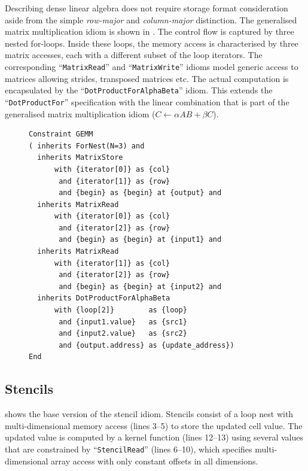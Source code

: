     Describing dense linear algebra does not require storage format
    consideration aside from the simple {\it row-major} and {\it column-major}
    distinction.
    The generalised matrix multiplication idiom is shown in .
    The control flow is captured by three nested for-loops.
    Inside these loops, the memory access is characterised by three matrix
    accesses, each with a different subset of the loop iterators.
    The corresponding ``{\tt MatrixRead}'' and ``{\tt MatrixWrite}'' idioms
    model generic access to matrices allowing strides, transposed matrices etc.
    The actual computation is encapsulated by the
    ``{\tt DotProductForAlphaBeta}'' idiom.
    This extends the ``{\tt DotProductFor}'' specification with the linear
    combination that is part of the generalised matrix multiplication idiom
    ($C\gets\alpha AB+\beta C$).

\begin{figure}[H]
\begin{lstlisting}[language=IDL, label={fig:gemm}, caption=
   {IDL specification of the generalised dense matrix-vector multiplication
    (GEMM)\leftskip=0pt\rightskip=0pt}]
Constraint GEMM
( inherits ForNest(N=3) and
  inherits MatrixStore
      with {iterator[0]} as {col}
       and {iterator[1]} as {row}
       and {begin} as {begin} at {output} and
  inherits MatrixRead
      with {iterator[0]} as {col}
       and {iterator[2]} as {row}
       and {begin} as {begin} at {input1} and
  inherits MatrixRead
      with {iterator[1]} as {col}
       and {iterator[2]} as {row}
       and {begin} as {begin} at {input2} and
  inherits DotProductForAlphaBeta
      with {loop[2]}        as {loop}
       and {input1.value}   as {src1}
       and {input2.value}   as {src2}
       and {output.address} as {update_address})
End
\end{lstlisting}
\end{figure}

\subsection{Stencils}

     shows the base version of the stencil idiom.
    Stencils consist of a loop nest with multi-dimensional memory access
    (lines 3--5) to store the updated cell value.
    The updated value is computed by a kernel function (lines 12--13) using
    several values that are constrained by ``{\tt StencilRead}'' (lines 6--10),
    which specifies multi-dimensional array access with only constant offsets in
    all dimensions.

